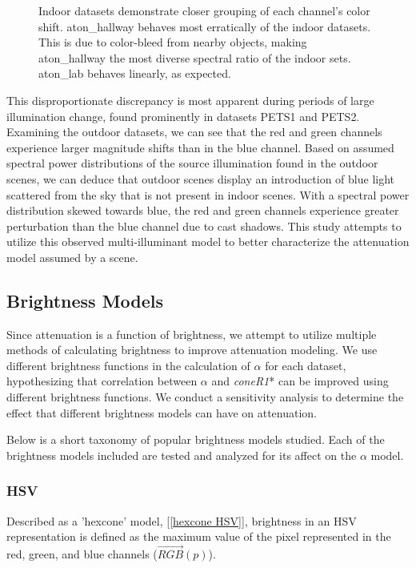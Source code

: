 \begin{figure}
\caption{Indoor datasets demonstrate closer grouping of each channel's color shift. aton\_hallway behaves most erratically of the indoor datasets. This is due to color-bleed from nearby objects, making aton\_hallway the most diverse spectral ratio of the indoor sets. aton\_lab behaves linearly, as expected.}
\label{fig:rgshift_indoor}
\end{figure}

This disproportionate discrepancy is most apparent during periods of large illumination change, found prominently in datasets PETS1 and PETS2. Examining the outdoor datasets, we can see that the red and green channels experience larger magnitude shifts than in the blue channel. Based on assumed spectral power distributions of the source illumination found in the outdoor scenes, we can deduce that outdoor scenes display an introduction of blue light scattered from the sky that is not present in indoor scenes. With a spectral power distribution skewed towards blue, the red and green channels experience greater perturbation than the blue channel due to cast shadows. This study attempts to utilize this observed multi-illuminant model to better characterize the attenuation model assumed by a scene. 

\subsection{Brightness Models} \label{section:brightnessmodels}

Since attenuation is a function of brightness, we attempt to utilize multiple methods of calculating brightness to improve attenuation modeling. We use different brightness functions in the calculation of $\alpha$ for each dataset, hypothesizing that correlation between $\alpha$ and \textit{coneR1}* can be improved using different brightness functions. We conduct a sensitivity analysis to determine the effect that different brightness models can have on attenuation.

Below is a short taxonomy of popular brightness models studied. Each of the brightness models included are tested and analyzed for its affect on the $\alpha$ model.

\subsubsection{HSV}

Described as a 'hexcone' model, [\ref{hexcone HSV}], brightness in an HSV representation is defined as the maximum value of the pixel represented in the red, green, and blue channels ($\vec{RGB}(p)$).

